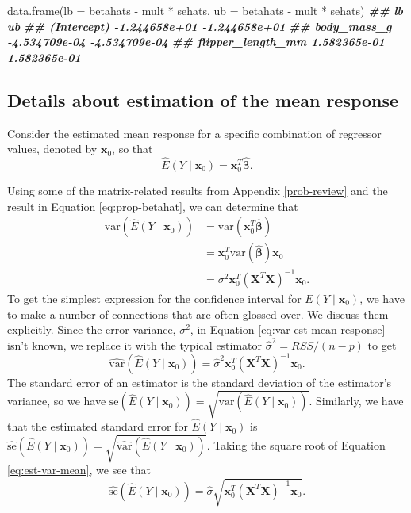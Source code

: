 \documentclass[
]{book}
\newenvironment{Shaded}{\begin{snugshade}}{\end{snugshade}}
\newcommand{\AttributeTok}[1]{\textcolor[rgb]{0.77,0.63,0.00}{#1}}
\newcommand{\DocumentationTok}[1]{\textcolor[rgb]{0.56,0.35,0.01}{\textbf{\textit{#1}}}}
\newcommand{\FunctionTok}[1]{\textcolor[rgb]{0.00,0.00,0.00}{#1}}
\newcommand{\NormalTok}[1]{#1}
\newcommand{\SpecialCharTok}[1]{\textcolor[rgb]{0.00,0.00,0.00}{#1}}
\theoremstyle{definition}
\theoremstyle{definition}
\theoremstyle{definition}
\theoremstyle{definition}
\theoremstyle{remark}
\begin{document}
\begin{Shaded}
\begin{Highlighting}[]
\FunctionTok{data.frame}\NormalTok{(}\AttributeTok{lb =}\NormalTok{ betahats }\SpecialCharTok{{-}}\NormalTok{ mult }\SpecialCharTok{*}\NormalTok{ sehats,}
           \AttributeTok{ub =}\NormalTok{ betahats }\SpecialCharTok{{-}}\NormalTok{ mult }\SpecialCharTok{*}\NormalTok{ sehats)}
\DocumentationTok{\#\#                              lb            ub}
\DocumentationTok{\#\# (Intercept)       {-}1.244658e+01 {-}1.244658e+01}
\DocumentationTok{\#\# body\_mass\_g       {-}4.534709e{-}04 {-}4.534709e{-}04}
\DocumentationTok{\#\# flipper\_length\_mm  1.582365e{-}01  1.582365e{-}01}
\end{Highlighting}
\end{Shaded}

\hypertarget{mean-response-calculations}{%
\subsection{Details about estimation of the mean response}\label{mean-response-calculations}}

Consider the estimated mean response for a specific combination of
regressor values, denoted by \(\mathbf{x}_0\), so that
\[\hat{E}(Y\mid \mathbf{x}_0)=\mathbf{x}_0^T\hat{\boldsymbol{\beta}}.\]

Using some of the matrix-related results from Appendix
\ref{prob-review} and the result in Equation \eqref{eq:prop-betahat}, we
can determine that \[
\begin{aligned}
\mathrm{var}\left(\hat{E}(Y \mid \mathbf{x}_0)\right) &= \mathrm{var}(\mathbf{x}_0^T \hat{\boldsymbol{\beta}}) \\
&= \mathbf{x}_0^T \mathrm{var}(\hat{\boldsymbol{\beta}})\mathbf{x}_0\\
&= \sigma^2 \mathbf{x}_0^T (\mathbf{X}^T \mathbf{X})^{-1}\mathbf{x}_0.
\end{aligned}
\label{eq:var-est-mean-response}
\] To get the simplest expression for the confidence interval for
\(E(Y\mid\mathbf{x}_0)\), we have to make a number of connections that are
often glossed over. We discuss them explicitly. Since the error
variance, \(\sigma^2\), in Equation \eqref{eq:var-est-mean-response} isn't
known, we replace it with the typical estimator
\(\hat{\sigma}^2=RSS/(n-p)\) to get
\[\hat{\mathrm{var}}\left(\hat{E}(Y\mid \mathbf{x}_0)\right)=\hat{\sigma}^2 \mathbf{x}_0^T (\mathbf{X}^T \mathbf{X})^{-1}\mathbf{x}_0.\label{eq:est-var-mean}\]
The standard error of an estimator is the standard deviation of the
estimator's variance, so we have
\(\mathrm{se}\left(\hat{E}(Y\mid\mathbf{x}_0)\right)=\sqrt{\mathrm{var}\left(\hat{E}(Y\mid \mathbf{x}_0)\right)}\).
Similarly, we have that the estimated standard error for
\(\hat{E}(Y\mid \mathbf{x}_0)\) is
\(\hat{\mathrm{se}}\left(\hat{E}(Y\mid\mathbf{x}_0)\right)=\sqrt{\hat{\mathrm{var}}\left(\hat{E}(Y\mid \mathbf{x}_0)\right)}\).
Taking the square root of Equation \eqref{eq:est-var-mean}, we see that
\[
\hat{\mathrm{se}}\left(\hat{E}(Y\mid \mathbf{x}_0)\right)=\hat{\sigma} \sqrt{\mathbf{x}_0^T (\mathbf{X}^T \mathbf{X})^{-1}\mathbf{x}_0}.
\]
\end{document}
